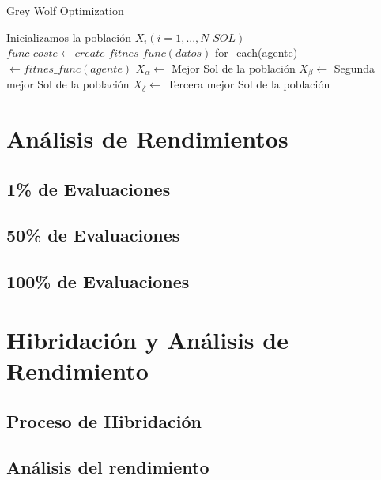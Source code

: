 \documentclass[a4paper, 12.5pt]{report}
\begin{document}
    \begin{algorithm}[H]
        \caption{Grey Wolf Optimization}\label{alg:GWO}
        \begin{algorithmic}[1]
                \State Inicializamos la población $X_i (i=1,...,N\_SOL)$
                \State $func\_coste \gets create\_fitnes\_func(datos)$
                \State for\_each(agente) $ \gets fitnes\_func(agente)$
                \State $X_\alpha \gets$ Mejor Sol de la población
                \State $X_\beta \gets$ Segunda mejor Sol de la población
                \State $X_\delta \gets$ Tercera mejor Sol de la población
                \State
            \EndFunction


        \end{algorithmic}
    \end{algorithm}


    \section{Análisis de Rendimientos}

    \subsection{1\% de Evaluaciones}

    \subsection{50\% de Evaluaciones}

    \subsection{100\% de Evaluaciones}


    \section{Hibridación y Análisis de Rendimiento}

    \subsection{Proceso de Hibridación}

    \subsection{Análisis del rendimiento}
\end{document}
